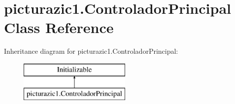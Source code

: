 \hypertarget{classpicturazic1_1_1_controlador_principal}{}\section{picturazic1.\+Controlador\+Principal Class Reference}
\label{classpicturazic1_1_1_controlador_principal}
Inheritance diagram for picturazic1.\+Controlador\+Principal\+:\begin{figure}[H]
\begin{center}
\leavevmode
\includegraphics[height=2.000000cm]{classpicturazic1_1_1_controlador_principal}
\end{center}
\end{figure}

